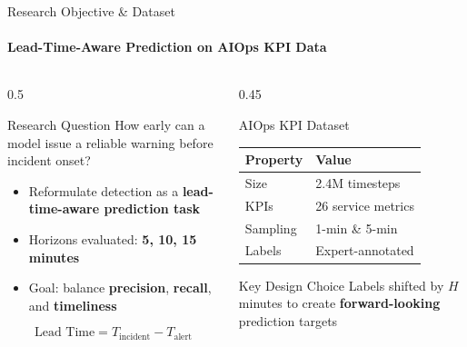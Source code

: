 \documentclass[aspectratio=169,11pt]{beamer}
\begin{document}
\begin{frame}{Research Objective \& Dataset}
\framesubtitle{Lead-Time-Aware Prediction on AIOps KPI Data}

\begin{columns}
\begin{column}{0.5\textwidth}
\begin{block}{Research Question}
How early can a model issue a reliable warning before incident onset?
\end{block}

\vspace{0.3em}
\begin{itemize}
    \item Reformulate detection as a \textbf{lead-time-aware prediction task}
    \item Horizons evaluated: \textbf{5, 10, 15 minutes}
    \item Goal: balance \textbf{precision}, \textbf{recall}, and \textbf{timeliness}
\end{itemize}

\vspace{0.3em}
{\small
\[
\text{Lead Time} = T_{\text{incident}} - T_{\text{alert}}
\]
}
\end{column}

\begin{column}{0.45\textwidth}
\begin{block}{AIOps KPI Dataset}
{\small
\begin{tabular}{ll}
\toprule
\textbf{Property} & \textbf{Value} \\
\midrule
Size & 2.4M timesteps \\
KPIs & 26 service metrics \\
Sampling & 1-min \& 5-min \\
Labels & Expert-annotated \\
\bottomrule
\end{tabular}
}
\end{block}

\vspace{0.3em}
\begin{alertblock}{Key Design Choice}
{\small Labels shifted by $H$ minutes to create \textbf{forward-looking} prediction targets}
\end{alertblock}
\end{column}
\end{columns}
\end{frame}
\end{document}
